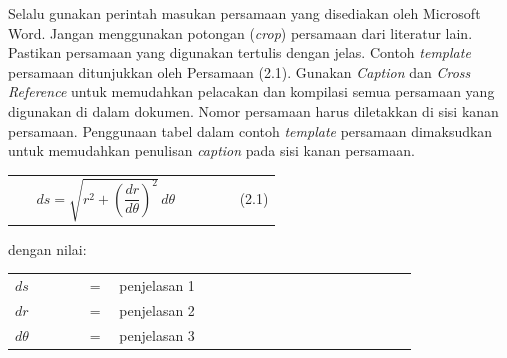 Selalu gunakan perintah masukan persamaan yang disediakan oleh Microsoft Word. Jangan menggunakan potongan (\textit{crop}) persamaan dari literatur lain. Pastikan persamaan yang digunakan tertulis dengan jelas. Contoh \textit{template} persamaan ditunjukkan oleh Persamaan (2.1). Gunakan \textit{Caption} dan \textit{Cross Reference} untuk memudahkan pelacakan dan kompilasi semua persamaan yang digunakan di dalam dokumen. Nomor persamaan harus diletakkan di sisi kanan persamaan. Penggunaan tabel dalam contoh \textit{template} persamaan dimaksudkan untuk memudahkan penulisan \textit{caption} pada sisi kanan persamaan.

\begin{tanpagaris}
\begin{longtable}{@{}p{0.08\linewidth}>{\centering\arraybackslash}p{0.76\linewidth}r@{}}
 & $ds=\sqrt{r^{2}+\left(\dfrac{dr}{d\theta}\right)^{2}}\,d\theta$ & (2.1) \\
\end{longtable}
\end{tanpagaris}

dengan nilai:

\begin{tanpagaris}
\begin{longtable}{@{}p{0.15\linewidth}p{0.05\linewidth}p{0.6\linewidth}@{}}
$ds$ & = & penjelasan 1 \\
$dr$ & = & penjelasan 2 \\
$d\theta$ & = & penjelasan 3 \\
\end{longtable}
\end{tanpagaris}
